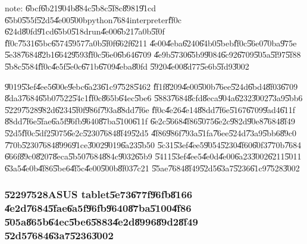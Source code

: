 note: \U{6bcf}\U{6b21}\U{904b}\U{884c}\U{5b8c}\U{5f8c}\U{8981}\U{91cd}%
\U{65b0}\U{555f}\U{52d5}\U{4e00}\U{500b}python\U{7684}interpreter\U{ff0c}%
\U{624d}\U{80fd}\U{91cd}\U{65b0}\U{518d}run\U{4e00}\U{6b21}\U{7a0b}\U{5f0f}%
\U{ff0c}\U{7531}\U{65bc}\U{6574}\U{5957}\U{7a0b}\U{5f0f}\U{662f}\U{6211}%
\U{4e00}\U{4eba}\U{6240}\U{64b0}\U{5beb}\U{ff0c}\U{56e0}\U{70ba}\U{975e}%
\U{5e38}\U{7684}\U{82b1}\U{6642}\U{9593}\U{ff0c}\U{56e0}\U{6b64}\U{6709}%
\U{4e9b}\U{5730}\U{65b9}\U{9084}\U{6c92}\U{6709}\U{505a}\U{5f97}\U{5f88}%
\U{5b8c}\U{5584}\U{ff0c}\U{4e5f}\U{5e0c}\U{671b}\U{6709}\U{4eba}\U{80fd}%
\U{5920}\U{4e00}\U{8d77}\U{5e6b}\U{5fd9}\U{3002}

\clearpage%

\U{9019}\U{53ef}\U{4ee5}\U{600e}\U{9ebc}\U{6a23}\U{61c9}\U{7528}\U{5462}%
\U{ff1f}\U{8209}\U{4e00}\U{500b}\U{76ee}\U{524d}\U{6bd4}\U{8f03}\U{6709}%
\U{8da3}\U{7684}\U{65b0}\U{7522}\U{54c1}\U{ff0c}\U{865b}\U{64ec}\U{5be6}%
\U{5883}\U{7684}\U{8cfd}\U{8eca}\U{904a}\U{6232}\U{3002}\U{73a9}\U{5bb6}%
\U{5229}\U{7528}\U{982d}\U{6234}\U{5f0f}\U{986f}\U{793a}\U{88dd}\U{7f6e}%
\U{ff0c}\U{4e26}\U{4e14}\U{88dd}\U{7f6e}\U{5167}\U{6709}\U{9ad4}\U{611f}%
\U{88dd}\U{7f6e}\U{5fae}\U{6a5f}\U{96fb}\U{9640}\U{87ba}\U{5100}\U{611f}%
\U{6e2c}\U{5668}\U{4f86}\U{5075}\U{6e2c}\U{982d}\U{90e8}\U{7684}\U{8f49}%
\U{52d5}\U{ff0c}\U{5df2}\U{5075}\U{6e2c}\U{5230}\U{7684}\U{8f49}\U{52d5}%
\U{4f86}\U{986f}\U{793a}\U{51fa}\U{76ee}\U{524d}\U{73a9}\U{5bb6}\U{89c0}%
\U{770b}\U{5230}\U{7684}\U{8996}\U{91ce}\U{3002}\U{9019}\U{6a23}\U{5b50}%
\U{5c31}\U{53ef}\U{4ee5}\U{9054}\U{5230}\U{4f60}\U{60f3}\U{770b}\U{7684}%
\U{666f}\U{89c0}\U{8207}\U{8eca}\U{5b50}\U{7684}\U{884c}\U{9032}\U{65b9}%
\U{5411}\U{53ef}\U{4ee5}\U{4e0d}\U{4e00}\U{6a23}\U{3002}\U{6211}\U{5011}%
\U{63a5}\U{4e0b}\U{4f86}\U{5be6}\U{4f5c}\U{4e00}\U{500b}\U{8f03}\U{7c21}%
\U{55ae}\U{7684}\U{8f49}\U{52d5}\U{63a7}\U{5236}\U{61c9}\U{7528}\U{3002}

\subsubsection{\U{5229}\U{7528}ASUS tablet\U{5e73}\U{677f}\U{96fb}\U{8166}%
\U{4e2d}\U{7684}\U{5fae}\U{6a5f}\U{96fb}\U{9640}\U{87ba}\U{5100}\U{4f86}%
\U{505a}\U{865b}\U{64ec}\U{5be6}\U{5883}\U{4e2d}\U{8996}\U{89d2}\U{8f49}%
\U{52d5}\U{7684}\U{63a7}\U{5236}\U{3002}}

